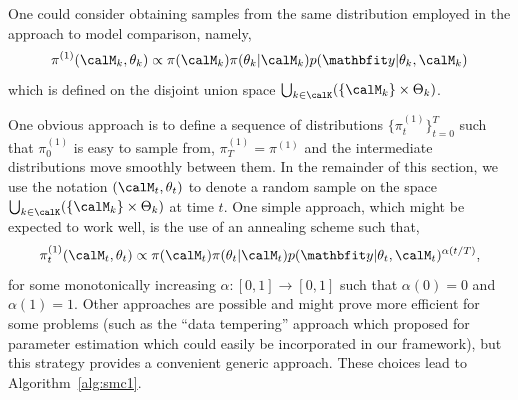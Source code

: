 One could consider obtaining samples from the same distribution employed in
the \rjmcmc approach to model comparison, namely,
\begin{equation}
  \pi^{(1)}(\Mk,\paramk) \propto \pi(\Mk)\pi(\paramk|\Mk)p(\data|\paramk,\Mk)
\end{equation}
which is defined on the disjoint union space
$\bigcup_{k\in\calK}(\{\Mk\}\times\Paramk)$.

One obvious \smc approach is to define a sequence of distributions
$\{\pi_t^{(1)}\}_{t=0}^T$ such that $\pi^{(1)}_0$ is easy to sample from,
$\pi_{T}^{(1)} = \pi^{(1)}$ and the intermediate distributions move smoothly
between them. In the remainder of this section, we use the notation
$(\Mk[t],\paramk[t])$ to denote a random sample on the space
$\bigcup_{k\in\calK}(\{\Mk\}\times\Paramk)$ at time $t$. One simple approach,
which might be expected to work well, is the use of an annealing scheme such
that,
\begin{equation}
  \pi^{(1)}_t(\Mk[t],\paramk[t]) \propto \pi(\Mk[t])\pi(\paramk[t]|\Mk[t])
  p(\data|\paramk[t],\Mk[t])^{\alpha(t/T)},
  \label{eq:geometry_1}
\end{equation}
for some monotonically increasing $\alpha:[0,1]\to[0,1]$ such that $\alpha(0)
= 0$ and $\alpha(1) = 1$. Other approaches are possible and might prove more
efficient for some problems (such as the ``data tempering'' approach which
\cite{Chopin:2002hg} proposed for parameter estimation which could easily
be incorporated in our framework), but this strategy provides a convenient
generic approach. These choices lead to Algorithm~\ref{alg:smc1}.



